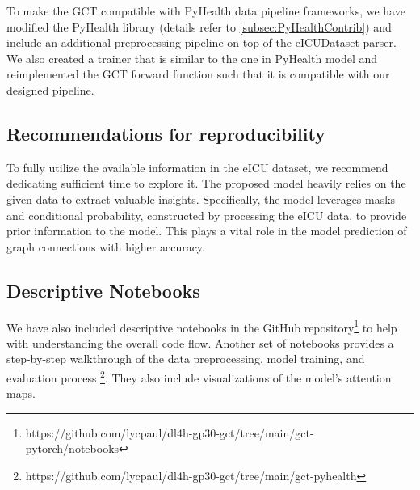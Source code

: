 \documentclass[11pt,a4paper]{article}
\begin{document}
To make the GCT compatible with PyHealth data pipeline frameworks, we have modified the PyHealth library (details refer to \ref{subsec:PyHealthContrib}) and include an additional preprocessing pipeline on top of the eICUDataset parser. We also created a trainer that is similar to the one in PyHealth model and reimplemented the GCT forward function such that it is compatible with our designed pipeline.




\subsection{Recommendations for reproducibility}
To fully utilize the available information in the eICU dataset, we recommend dedicating sufficient time to explore it. The proposed model heavily relies on the given data to extract valuable insights. Specifically, the model leverages masks and conditional probability, constructed by processing the eICU data, to provide prior information to the model. This plays a vital role in the model prediction of graph connections with higher accuracy.

\subsection{Descriptive Notebooks}
We have also included descriptive notebooks in the GitHub repository\footnote{https://github.com/lycpaul/dl4h-gp30-gct/tree/main/gct-pytorch/notebooks} to help with understanding the overall code flow. Another set of notebooks provides a step-by-step walkthrough of the data preprocessing, model training, and evaluation process \footnote{https://github.com/lycpaul/dl4h-gp30-gct/tree/main/gct-pyhealth}. They also include visualizations of the model's attention maps.
\end{document}
